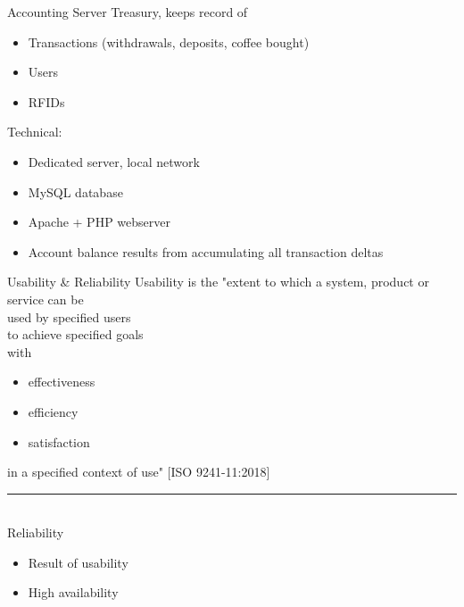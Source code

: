\documentclass[t]{beamer}
\begin{document}
\begin{frame}{Accounting Server}
    Treasury, keeps record of
    \begin{itemize}
        \item Transactions (withdrawals, deposits, coffee bought)
        \item Users
        \item RFIDs
    \end{itemize}

    \vspace*{2em}
    Technical:
    \begin{itemize}
        \item Dedicated server, local network
        \item MySQL database
        \item Apache + PHP webserver
        \item Account balance results from accumulating all transaction deltas
    \end{itemize}
\end{frame}



\begin{frame}{Usability \& Reliability}
    Usability is the "extent to which a system, product or service can be \\
    \vspace*{0.8em}
    used by \textcolor{KITgreen}{specified users} \\
    \vspace*{0.8em}
    to achieve \textcolor{KITgreen}{specified goals} \\
    \vspace*{0.8em}
    with
    \begin{itemize}
        \item \textcolor{KITgreen}{effectiveness}
        \item \textcolor{KITgreen}{efficiency}
        \item \textcolor{KITgreen}{satisfaction}
    \end{itemize}
    \vspace*{0.8em}
    in a \textcolor{KITgreen}{specified context of use}" \scriptsize [ISO 9241-11:2018] \normalsize \\
    \rule{4cm}{0.4pt} \\
    \vspace*{.5em}
    Reliability
    \begin{itemize}
        \item Result of usability
        \item High availability
    \end{itemize}
\end{frame}
\end{document}
